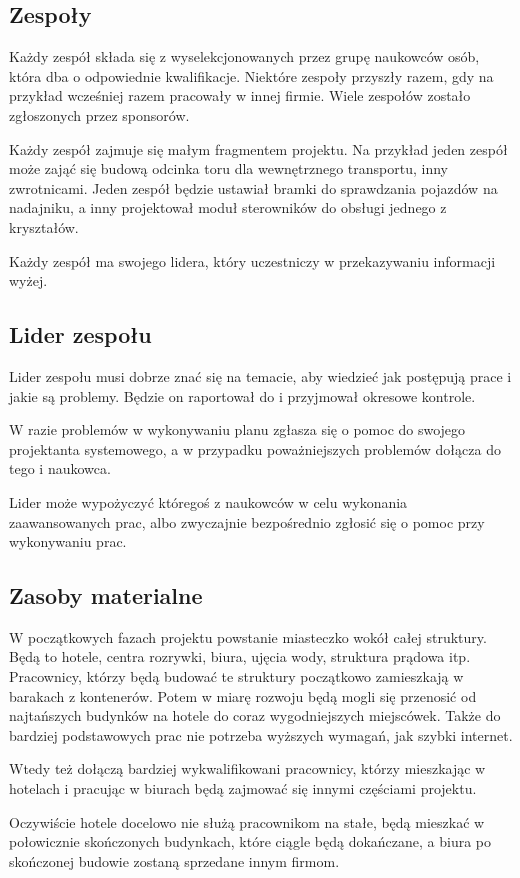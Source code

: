 \subsection{Zespoły}
Każdy zespół składa się z wyselekcjonowanych przez grupę naukowców osób, która dba o odpowiednie kwalifikacje.
Niektóre zespoły przyszły razem, gdy na przykład wcześniej razem pracowały w innej firmie.
Wiele zespołów zostało zgłoszonych przez sponsorów.

Każdy zespół zajmuje się małym fragmentem projektu. Na przykład jeden zespół może zająć się budową odcinka toru dla wewnętrznego transportu, inny zwrotnicami.
Jeden zespół będzie ustawiał bramki do sprawdzania pojazdów na nadajniku, a inny projektował moduł sterowników do obsługi jednego z kryształów.

Każdy zespół ma swojego lidera, który uczestniczy w przekazywaniu informacji wyżej.

\subsection{Lider zespołu}
Lider zespołu musi dobrze znać się na temacie, aby wiedzieć jak postępują prace i jakie są problemy. 
Będzie on raportował do i przyjmował okresowe kontrole.

W razie problemów w wykonywaniu planu zgłasza się o pomoc do swojego projektanta systemowego, a w przypadku poważniejszych problemów dołącza do tego i naukowca.

Lider może wypożyczyć któregoś z naukowców w celu wykonania zaawansowanych prac, albo zwyczajnie bezpośrednio zgłosić się o pomoc przy wykonywaniu prac.

\subsection{Zasoby materialne}
W początkowych fazach projektu powstanie miasteczko wokół całej struktury. Będą to hotele, centra rozrywki, biura, ujęcia wody, struktura prądowa itp.
Pracownicy, którzy będą budować te struktury początkowo zamieszkają w barakach z kontenerów. Potem w miarę rozwoju będą mogli się przenosić od najtańszych budynków na hotele do coraz wygodniejszych miejscówek.
Także do bardziej podstawowych prac nie potrzeba wyższych wymagań, jak szybki internet.

Wtedy też dołączą bardziej wykwalifikowani pracownicy, którzy mieszkając w hotelach i pracując w biurach będą zajmować się innymi częściami projektu.

Oczywiście hotele docelowo nie służą pracownikom na stałe, będą mieszkać w połowicznie skończonych budynkach, które ciągle będą dokańczane, a biura po skończonej budowie zostaną sprzedane innym firmom.

